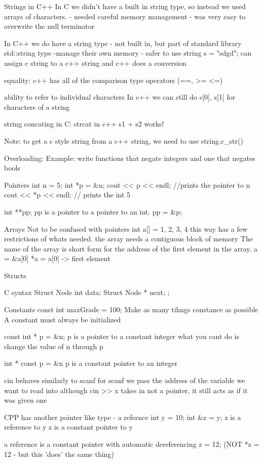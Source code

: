 \documentclass[12pt,oneside,fleqn]{book}
\begin{document}
Strings in C++
In C we didn't have a built in string type, so instead we used arrays of characters.
- needed careful memory management
- was very easy to overwrite the null terminator

In C++ we do have a string type
- not built in, but part of standard library
std::string type
-manage their own memory
- safer to use
string s = "sdgd";
can assign c string to a c++ string and c++ does a conversion

equality: c++ has all of the comparison type operators (==, >= <=)

ability to refer to individual characters
In c++ we can still do s[0], s[1] for characters of a string

string concating
in C: strcat
in c++
s1 + s2 works!

Note: to get a c style string from a c++ string, we need to use string.c\_str()

Overloading:
Example:
write functions that negate integers and one that negates bools

Pointers
int n = 5;
int *p = \&n;
cout << p << endl; //prints the pointer to n
cout << *p << endl; // prints the int 5

int **pp;
pp is a pointer to a pointer to an int.
pp = \&p;

Arrays
Not to be confused with pointers
int a[] = { 1, 2, 3, 4}
this way has a few restrictions of whats needed. 
the array needs a contiguous block of memory
The name of the array is short form for the address of the first element in the array.
a = \&a[0]
*a = a[0] -> first element

Structs

C syntax
Struct Node {
	int data;
	Struct Node * next;
};

Constants
const int maxGrade = 100;
Make as many tihngs constance as possible
A constant must always be initialized

const int * p = \&n;
p is a pointer to a constant integer
what you cant do is change the value of n through p

int * const p = \&n p is a constant pointer to an integer

cin behaves similarly to scanf
for scanf we pass the address of the variable we want to read into
although cin >> x takes in not a pointer, it still acts as if it was given one

CPP has another pointer like type - a refernce
int y = 10;
int \&z = y;
z is a reference to y
z is a constant pointer to y

a reference is a constant pointer with automatic dereferencing
z = 12; (NOT *z = 12 - but this 'does' the same thing)
\end{document}
